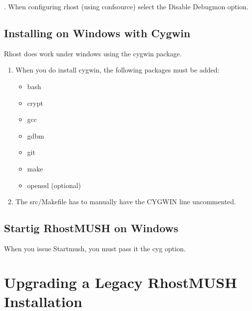 \documentclass[letterpaper,10pt,english]{sphinxmanual}
\begin{document}
. When configuring rhost (using confsource) select the Disable Debugmon
option.


\section{Installing on Windows with Cygwin}
\label{\detokenize{windows:installing-on-windows-with-cygwin}}
\sphinxAtStartPar
Rhost does work under windows using the cygwin package.
\begin{enumerate}
%
\item {} 
\sphinxAtStartPar
When you do install cygwin, the following packages must be added:
\begin{itemize}
\item {} 
\sphinxAtStartPar
bash

\item {} 
\sphinxAtStartPar
crypt

\item {} 
\sphinxAtStartPar
gcc

\item {} 
\sphinxAtStartPar
gdbm

\item {} 
\sphinxAtStartPar
git

\item {} 
\sphinxAtStartPar
make

\item {} 
\sphinxAtStartPar
openssl (optional)

\end{itemize}

\item {} 
\sphinxAtStartPar
The src/Makefile has to manually have the CYGWIN line uncommented.

\end{enumerate}


\section{Startig RhostMUSH on Windows}
\label{\detokenize{windows:startig-rhostmush-on-windows}}
\sphinxAtStartPar
When you issue Startmush, you must pass it the \sphinxhyphen{}cyg option.


\chapter{Upgrading a Legacy RhostMUSH Installation}
\label{\detokenize{legacy:upgrading-a-legacy-rhostmush-installation}}\label{\detokenize{legacy::doc}}
\end{document}
